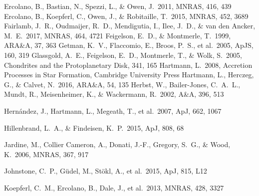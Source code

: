 \documentclass[10pt,fleqn,twoside]{article}
\newcommand*\aap{A\&A}
\newcommand*\apj{ApJ}
\newcommand*\apjl{ApJ}
\newcommand*\apjs{ApJS}
\newcommand*\araa{ARA\&A}
\newcommand*\mnras{MNRAS}
\begin{document}
\begin{thebibliography}{}
 Ercolano, B., Bastian, N., Spezzi, L., \& Owen, J.\ 2011, \mnras, 416, 439
 Ercolano, B., Koepferl, C., Owen, J., \& Robitaille, T.\ 2015, \mnras, 452, 3689 
 Fairlamb, J.~R., Oudmaijer, R.~D., Mendigutia, I., Ilee, J.~D., \& van den Ancker, M.~E.\ 2017, \mnras, 464, 4721
 Feigelson, E.~D., \& Montmerle, T.\ 1999, \araa, 37, 363 
 Getman, K.~V., Flaccomio, E., Broos, P.~S., et al.\ 2005, \apjs, 160, 319 
 Glassgold, A.~E., Feigelson, E.~D., Montmerle, T., \& Wolk, S.\ 2005, Chondrites and the Protoplanetary Disk, 341, 165
 Hartmann, L.\ 2008, Accretion Processes in Star Formation,  Cambridge University Press
 Hartmann, L., Herczeg, G., \& Calvet, N.\ 2016, \araa, 54, 135 
 Herbst, W., Bailer-Jones, C.~A.~L., Mundt, R., Meisenheimer, K., \& Wackermann, R.\ 2002, \aap, 396, 513 

 Hern{\'a}ndez, J., Hartmann, L., Megeath, T., et al.\ 2007, \apj, 662, 1067 

 Hillenbrand, L.~A., \& Findeisen, K.~P.\ 2015, \apj, 808, 68 

 Jardine, M., Collier Cameron, A., Donati, J.-F., Gregory, S.~G., \& Wood, K.\ 2006, \mnras, 367, 917

 Johnstone, C.~P., G{\"u}del, M., St{\"o}kl, A., et al.\ 2015, \apjl, 815, L12

 Koepferl, C.~M., Ercolano, B., Dale, J., et al.\ 2013, \mnras, 428, 3327


\end{thebibliography}
\end{document}
